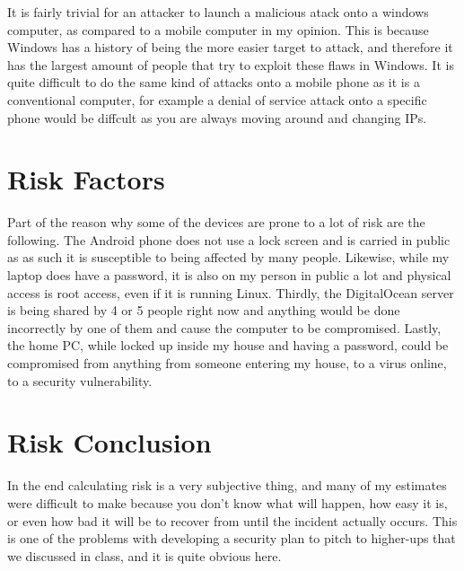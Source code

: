 \documentclass[a4paper, 11pt]{article}
\begin{document}
It is fairly trivial for an attacker to launch a malicious atack onto a windows computer, as compared to a mobile computer in my opinion.  This is because Windows has a history of being the more easier target to attack, and therefore it has the largest amount of people that try to exploit these flaws in Windows.  It is quite difficult to do the same kind of attacks onto a mobile phone as it is a conventional computer, for example a denial of service attack onto a specific phone would be diffcult as you are always moving around and changing IPs.\\

\section*{Risk Factors}
Part of the reason why some of the devices are prone to a lot of risk are the following.  The Android phone does not use a lock screen and is carried in public as as such it is susceptible to being affected by many people.  Likewise, while my laptop does have a password, it is also on my person in public a lot and physical access is root access, even if it is running Linux.  Thirdly, the DigitalOcean server is being shared by 4 or 5 people right now and anything would be done incorrectly by one of them and cause the computer to be compromised.  Lastly, the home PC, while locked up inside my house and having a password, could be compromised from anything from someone entering my house, to a virus online, to a security vulnerability.

\section*{Risk Conclusion}
In the end calculating risk is a very subjective thing, and many of my estimates were difficult to make because you don't know what will happen, how easy it is, or even how bad it will be to recover from until the incident actually occurs.  This is one of the problems with developing a security plan to pitch to higher-ups that we discussed in class, and it is quite obvious here.

%
\end{document}
